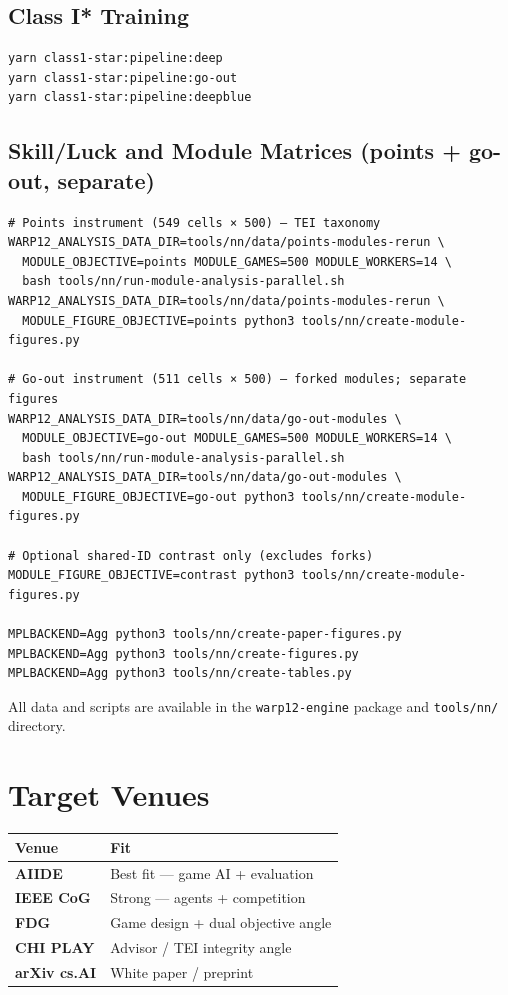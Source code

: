 \documentclass[11pt,letterpaper]{article}
\begin{document}
\subsection{Class I* Training}
\begin{verbatim}
yarn class1-star:pipeline:deep
yarn class1-star:pipeline:go-out
yarn class1-star:pipeline:deepblue
\end{verbatim}

\subsection{Skill/Luck and Module Matrices (points + go-out, separate)}
\begin{verbatim}
# Points instrument (549 cells × 500) — TEI taxonomy
WARP12_ANALYSIS_DATA_DIR=tools/nn/data/points-modules-rerun \
  MODULE_OBJECTIVE=points MODULE_GAMES=500 MODULE_WORKERS=14 \
  bash tools/nn/run-module-analysis-parallel.sh
WARP12_ANALYSIS_DATA_DIR=tools/nn/data/points-modules-rerun \
  MODULE_FIGURE_OBJECTIVE=points python3 tools/nn/create-module-figures.py

# Go-out instrument (511 cells × 500) — forked modules; separate figures
WARP12_ANALYSIS_DATA_DIR=tools/nn/data/go-out-modules \
  MODULE_OBJECTIVE=go-out MODULE_GAMES=500 MODULE_WORKERS=14 \
  bash tools/nn/run-module-analysis-parallel.sh
WARP12_ANALYSIS_DATA_DIR=tools/nn/data/go-out-modules \
  MODULE_FIGURE_OBJECTIVE=go-out python3 tools/nn/create-module-figures.py

# Optional shared-ID contrast only (excludes forks)
MODULE_FIGURE_OBJECTIVE=contrast python3 tools/nn/create-module-figures.py

MPLBACKEND=Agg python3 tools/nn/create-paper-figures.py
MPLBACKEND=Agg python3 tools/nn/create-figures.py
MPLBACKEND=Agg python3 tools/nn/create-tables.py
\end{verbatim}

All data and scripts are available in the \texttt{warp12-engine} package and \texttt{tools/nn/} directory.

\section{Target Venues}

\begin{table}[h]
\centering
\begin{tabular}{@{}ll@{}}
\toprule
\textbf{Venue} & \textbf{Fit} \\
\midrule
\textbf{AIIDE} & Best fit --- game AI + evaluation \\
\textbf{IEEE CoG} & Strong --- agents + competition \\
\textbf{FDG} & Game design + dual objective angle \\
\textbf{CHI PLAY} & Advisor / TEI integrity angle \\
\textbf{arXiv cs.AI} & White paper / preprint \\
\bottomrule
\end{tabular}
\end{table}
\end{document}
